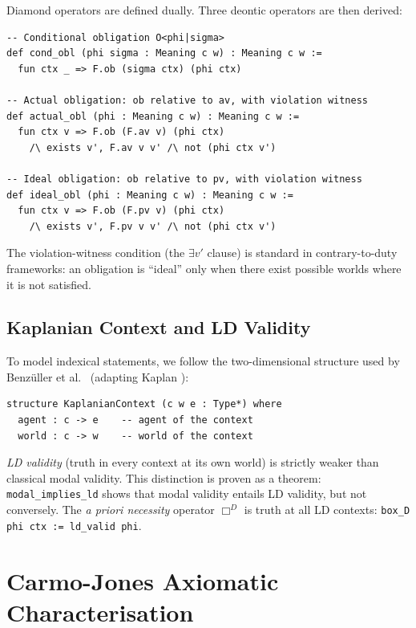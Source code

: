\documentclass[]{article}
\newcommand{\code}[1]{\texttt{#1}}
\begin{document}
\noindent
Diamond operators are defined dually.
Three deontic operators are then derived:

\begin{lstlisting}
-- Conditional obligation O<phi|sigma>
def cond_obl (phi sigma : Meaning c w) : Meaning c w :=
  fun ctx _ => F.ob (sigma ctx) (phi ctx)

-- Actual obligation: ob relative to av, with violation witness
def actual_obl (phi : Meaning c w) : Meaning c w :=
  fun ctx v => F.ob (F.av v) (phi ctx)
    /\ exists v', F.av v v' /\ not (phi ctx v')

-- Ideal obligation: ob relative to pv, with violation witness
def ideal_obl (phi : Meaning c w) : Meaning c w :=
  fun ctx v => F.ob (F.pv v) (phi ctx)
    /\ exists v', F.pv v v' /\ not (phi ctx v')
\end{lstlisting}

\noindent
The violation-witness condition (the $\exists v'$ clause) is standard in
contrary-to-duty frameworks: an obligation is ``ideal'' only when there exist
possible worlds where it is not satisfied.

\subsection{Kaplanian Context and LD Validity}

To model indexical statements, we follow the two-dimensional structure used by
Benz{\"u}ller et al.\ \cite{Benzmuller2018} (adapting Kaplan \cite{Kaplan1989}):

\begin{lstlisting}
structure KaplanianContext (c w e : Type*) where
  agent : c -> e    -- agent of the context
  world : c -> w    -- world of the context
\end{lstlisting}

\noindent
\emph{LD validity} (truth in every context at its own world) is strictly weaker
than classical modal validity.
This distinction is proven as a theorem:
\code{modal\_implies\_ld} shows that modal validity entails LD validity, but not conversely.
The \emph{a priori necessity} operator $\Box^D$ is truth at all LD contexts:
\code{box\_D phi ctx := ld\_valid phi}.

\section{Carmo-Jones Axiomatic Characterisation}
\label{sec:cj}
\end{document}
